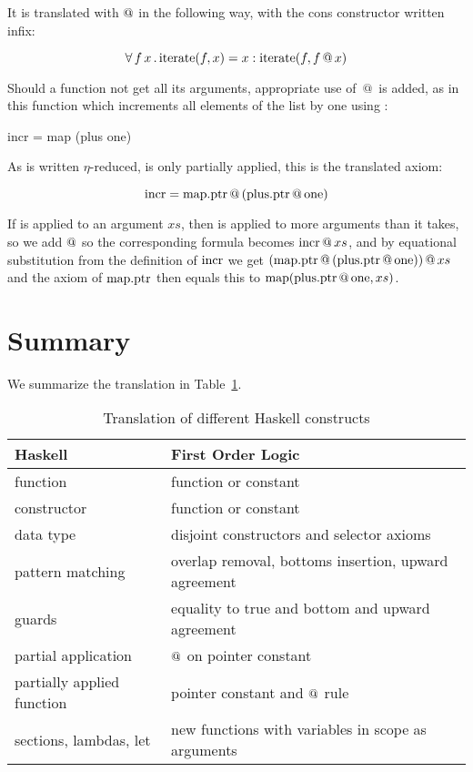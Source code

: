 It is translated with $@$ in the following way, with the cons
constructor \hs{:} written infix:

\begin{equation*}
\forall \, f \, x \, . \, \mathrm{iterate}(f,x) = x : \mathrm{iterate}(f,f \, @ \, x)
\end{equation*}

Should a function not get all its arguments, appropriate use of $\, @ \, $ is
added, as in this function which increments all elements of the list
by one using :

\begin{code}
incr = map (plus one)
\end{code}

As  is written $\eta$-reduced,  is
only partially applied, this is the translated axiom:

\begin{equation*}
\mathrm{incr} = \mathrm{map.ptr} \, @ \, (\mathrm{plus.ptr} \, @ \, \mathrm{one})
\end{equation*}

If  is applied to an argument $xs$, then  is applied
to more arguments than it takes, so we add $@$ so the
corresponding formula becomes $\mathrm{incr} \, @ \, xs$, and by equational
substitution from the definition of $\mathrm{incr}$ we get
$(\mathrm{map.ptr} \, @ \, (\mathrm{plus.ptr} \, @ \, \mathrm{one})) \, @ \, xs$ and
the axiom of $\mathrm{map.ptr}$ then equals this to
$\mathrm{map}(\mathrm{plus.ptr} \, @ \, \mathrm{one},xs)$.

\section{Summary}

We summarize the translation in Table~\ref{tab:transtable}.

\begin{table}[h]
  \centering
  \begin{tabular}{|l|l|}
    \hline
    Haskell                    & First Order Logic \\
    \hline
    function                   & function or constant \\
    constructor                & function or constant \\
    data type                  & disjoint constructors and selector axioms \\
    pattern matching           & overlap removal, bottoms insertion, upward agreement \\
    guards                     & equality to true and bottom and upward agreement \\
    partial application        & $@$ on pointer constant \\
    partially applied function & pointer constant and $@$ rule \\
    sections, lambdas, let     & new functions with variables in scope as arguments \\
    \hline
  \end{tabular}
  \caption{Translation of different Haskell constructs
    \label{tab:transtable}
  }
\end{table}

